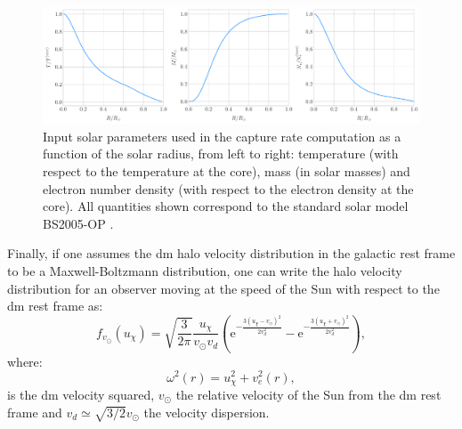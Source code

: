 \begin{figure}[t]
	\centering
	\includegraphics[width=1\linewidth]{Images/DM_Analysis/ssm_params.pdf}
	\caption[Input solar parameters used in the capture rate computation as a function of the solar radius.]{Input solar parameters used in the capture rate computation as a function of the solar radius, from left to right: temperature (with respect to the temperature at the core), mass (in solar masses) and electron number density (with respect to the electron density at the core). All quantities shown correspond to the standard solar model BS2005-OP \cite{Bahcall2004}.}
	\label{fig:ssm_params}
\end{figure}

Finally, if one assumes the \gls{dm} halo velocity distribution in the galactic rest frame to be a Maxwell-Boltzmann distribution, one can write the halo velocity distribution for an observer moving at the speed of the Sun with respect to the \gls{dm} rest frame as:
\begin{equation}\label{2.12}
	f_{v_{\odot}}(u_{\chi}) = \sqrt{\frac{3}{2\pi}} \frac{u_{\chi}}{v_{\odot} v_{d}} \left(\mathrm{e}^{-\frac{3(u_{\chi}-v_{\odot})^{2}}{2v_{d}^{2}}}-\mathrm{e}^{-\frac{3(u_{\chi}+v_{\odot})^{2}}{2v_{d}^{2}}}\right),
\end{equation}
where:
\begin{equation}\label{2.13}
	\omega^{2}(r) = u_{\chi}^{2} + v_{e}^{2}(r),
\end{equation}
is the \gls{dm} velocity squared, $v_{\odot}$ the relative velocity of the Sun from the \gls{dm} rest frame and $v_{d} \simeq \sqrt{3/2} v_{\odot}$ the velocity dispersion.

